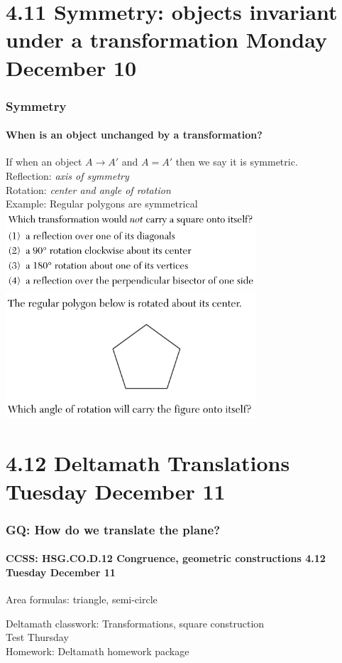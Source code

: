 \documentclass{beamer}
\begin{document}
  \section{4.11 Symmetry: objects invariant under a transformation Monday December 10}
    \frame
    {
      \frametitle{Symmetry}
      \framesubtitle{When is an object unchanged by a transformation?}

      If when an object $A \rightarrow A'$ and $A = A'$ then we say it is symmetric. \\
      Reflection: \emph{axis of symmetry}\\
      Rotation: \emph{center and angle of rotation}\\[0.25cm]
      Example: Regular polygons are symmetrical\\[0.25cm]

      \pause \includegraphics[width=0.7\textwidth]{symmetry-square_JA2018-15.png}\\
      \pause \includegraphics[width=0.7\textwidth]{symmetry_JN2018-19.png}
    }

  \section{4.12 Deltamath Translations Tuesday December 11}
    \frame
    {
      \frametitle{GQ: How do we translate the plane?}
      \framesubtitle{CCSS: HSG.CO.D.12 Congruence, geometric constructions  \alert{4.12 Tuesday December 11}}

      \begin{block}{Area formulas: triangle, semi-circle}
      \end{block}
      Deltamath classwork: Transformations, square construction\\[0.5cm]
      \alert{Test Thursday} \\[0.5cm]
      Homework: Deltamath homework package
    }
\end{document}
